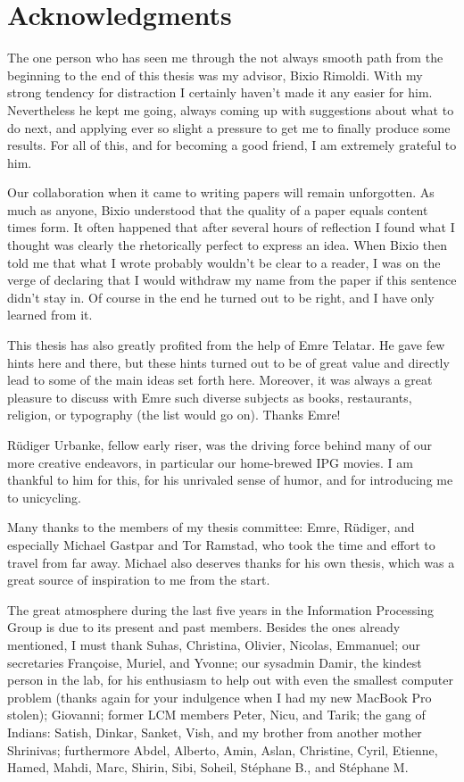 \chapter*{Acknowledgments}

The one person who has seen me through the not always smooth path from the
beginning to the end of this thesis was my advisor, Bixio Rimoldi. With my
strong tendency for distraction I certainly haven't made it any easier for him.
Nevertheless he kept me going, always coming up with suggestions about what to
do next, and applying ever so slight a pressure to get me to finally produce
some results. For all of this, and for becoming a good friend, I am extremely
grateful to him. 

Our collaboration when it came to writing papers will remain unforgotten. As
much as anyone, Bixio understood that the quality of a paper equals content
times form. It often happened that after several hours of reflection I found
what I thought was clearly the rhetorically perfect to express an
idea.  When Bixio then told me that what I wrote probably wouldn't be clear to a
reader, I was on the verge of declaring that I would withdraw my name from the
paper if this sentence didn't stay in. Of course in the end he turned out to be
right, and I have only learned from it.

This thesis has also greatly profited from the help of Emre Telatar. He gave few
hints here and there, but these hints turned out to be of great value and
directly lead to some of the main ideas set forth here. Moreover, it was always
a great pleasure to discuss with Emre such diverse subjects as books,
restaurants, religion, or typography (the list would go on). Thanks Emre!

Rüdiger Urbanke, fellow early riser, was the driving force behind many of our
more creative endeavors, in particular our home-brewed IPG movies. I am thankful
to him for this, for his unrivaled sense of humor, and for introducing me to
unicycling. 

Many thanks to the members of my thesis committee: Emre, Rüdiger, and especially
Michael Gastpar and Tor Ramstad, who took the time and effort to travel from far
away. Michael also deserves thanks for his own thesis, which was a great source
of inspiration to me from the start.

The great atmosphere during the last five years in the Information Processing
Group is due to its present and past members. Besides the ones already
mentioned, I must thank Suhas, Christina, Olivier, Nicolas, Emmanuel; our
secretaries Françoise, Muriel, and Yvonne; our sysadmin Damir, the kindest
person in the lab, for his enthusiasm to help out with even the smallest
computer problem (thanks again for your indulgence when I had my new MacBook Pro
stolen); Giovanni; former LCM members Peter, Nicu, and Tarik; the gang of
Indians: Satish, Dinkar, Sanket, Vish, and my brother from another mother
Shrinivas; furthermore Abdel, Alberto, Amin, Aslan, Christine, Cyril, Etienne,
Hamed, Mahdi, Marc, Shirin, Sibi, Soheil, Stéphane B., and Stéphane M.

